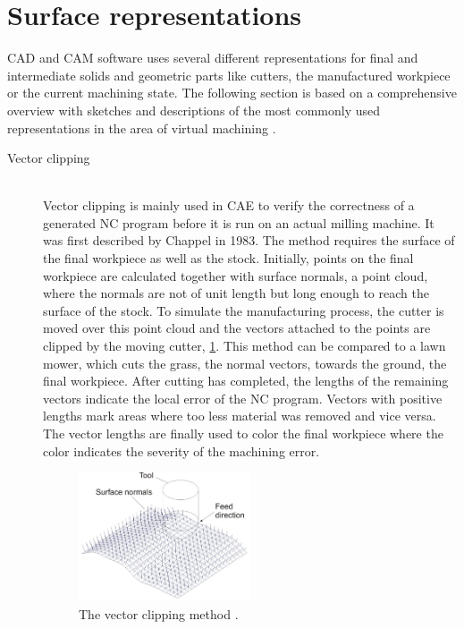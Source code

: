 \section{Surface representations}
\label{sec:surface_representations}

CAD and CAM software uses several different representations for final and intermediate solids and geometric parts like cutters, the manufactured workpiece or the current machining state.
The following section is based on a comprehensive overview with sketches and descriptions of the most commonly used representations in the area of virtual machining \cite{virtual_machining_review}.

\begin{description}
	\item[Vector clipping] \hfill \\
	Vector clipping is mainly used in CAE to verify the correctness of a generated NC program before it is run on an actual milling machine.
	It was first described by Chappel \cite{vector_clipping} in 1983.
	The method requires the surface of the final workpiece as well as the stock.
	Initially, points on the final workpiece are calculated together with surface normals, \ie a point cloud, where the normals are not of unit length but long enough to reach the surface of the stock.
	To simulate the manufacturing process, the cutter is moved over this point cloud and the vectors attached to the points are clipped by the moving cutter, \cf \cref{fig:vector_clipping}.
	This method can be compared to a lawn mower, which cuts the grass, \ie the normal vectors, towards the ground, \ie the final workpiece.
	After cutting has completed, the lengths of the remaining vectors indicate the local error of the NC program.
	Vectors with positive lengths mark areas where too less material was removed and vice versa.
	The vector lengths are finally used to color the final workpiece where the color indicates the severity of the machining error.

	\begin{figure}[H]
		\centering
		\includegraphics[width=0.5\textwidth]{images/vector_clipping}
		\caption{
			The vector clipping method \cite{virtual_machining_review}.
		}
		\label{fig:vector_clipping}
	\end{figure}



\end{description}
